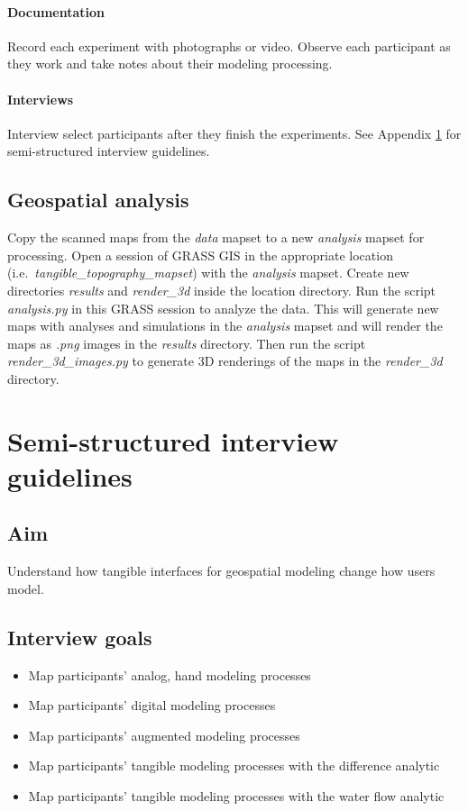 \documentclass[prodmode,acmtochi]{acmsmall} %
\begin{document}
\paragraph{Documentation}
Record each experiment with photographs or video.
Observe each participant as they work
and take notes about their modeling processing.

\paragraph{Interviews}
Interview select participants after they finish the experiments. 
See Appendix \ref{appendix:guidelines} for semi-structured interview guidelines.

\subsection{Geospatial analysis}\label{appendix:analysis}
Copy the scanned maps from the \emph{data} mapset 
to a new \emph{analysis} mapset for processing. 
Open a session of GRASS GIS 
in the appropriate location (i.e.~\emph{tangible\_topography\_mapset}) 
with the \emph{analysis} mapset.
Create new directories \emph{results} and \emph{render\_3d} 
inside the location directory.
Run the script \emph{analysis.py} in this GRASS session to analyze the data. 
This will generate new maps with analyses and simulations in the \emph{analysis} mapset
and will render the maps as \emph{.png} images in the \emph{results} directory.
Then run the script \emph{render\_3d\_images.py} 
to generate 3D renderings of the maps in the \emph{render\_3d} directory.

\vfill
\clearpage

\section{Semi-structured interview guidelines}\label{appendix:guidelines}
\vspace*{0.5em}

\subsection{Aim}
Understand how tangible interfaces for geospatial modeling change how users model.
\vspace*{0.5em}

\subsection{Interview goals}
\begin{itemize}
\item Map participants' analog, hand modeling processes
\item Map participants' digital modeling processes
\item Map participants' augmented modeling processes
\item Map participants' tangible modeling processes with the difference analytic
\item Map participants' tangible modeling processes with the water flow analytic
\end{itemize}
\vspace*{0.5em}
\end{document}
